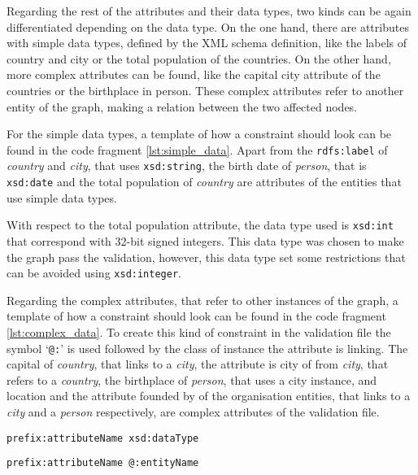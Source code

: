 \documentclass[11pt]{article}
\begin{document}
Regarding the rest of the attributes and their data types, two kinds can be again differentiated depending on the data type. On the one hand, there are attributes with simple data types, defined by the XML schema definition, like the labels of country and city or the total population of the countries. On the other hand, more complex attributes can be found, like the capital city attribute of the countries or the birthplace in person. These complex attributes refer to another entity of the graph, making a relation between the two affected nodes.

For the simple data types, a template of how a constraint should look can be found in the code fragment \ref{lst:simple_data}.
Apart from the \texttt{rdfs:label} of \textit{country} and \textit{city}, that uses \texttt{xsd:string}, the birth date of \textit{person}, that is \texttt{xsd:date} and the total population of \textit{country} are attributes of the entities that use simple data types.

With respect to the total population attribute, the data type used is \texttt{xsd:int} that correspond with 32-bit signed integers. 
This data type was chosen to make the graph pass the validation, however, this data type set some restrictions that can be avoided using \texttt{xsd:integer}.

Regarding the complex attributes, that refer to other instances of the graph, a template of how a constraint should look can be found in the code fragment \ref{lst:complex_data}. To create this kind of constraint in the validation file the symbol `\texttt{@:}' is used followed by the class of instance the attribute is linking. The capital of \textit{country}, that links to a \textit{city}, the attribute is city of from \textit{city}, that refers to a \textit{country}, the birthplace of \textit{person}, that uses a city instance, and location and the attribute founded by of the organisation entities, that links to a \textit{city} and a \textit{person} respectively, are complex attributes of the validation file.

\noindent\begin{minipage}{.45\textwidth}
\begin{lstlisting}[caption=simple data type constrain,frame=single,label={lst:simple_data}]
prefix:attributeName xsd:dataType
\end{lstlisting}
\end{minipage}\hfill
\begin{minipage}{.45\textwidth}
\begin{lstlisting}[caption=complex data type constrain,frame=single,label={lst:complex_data}]
prefix:attributeName @:entityName
\end{lstlisting}
\end{minipage}
\end{document}
